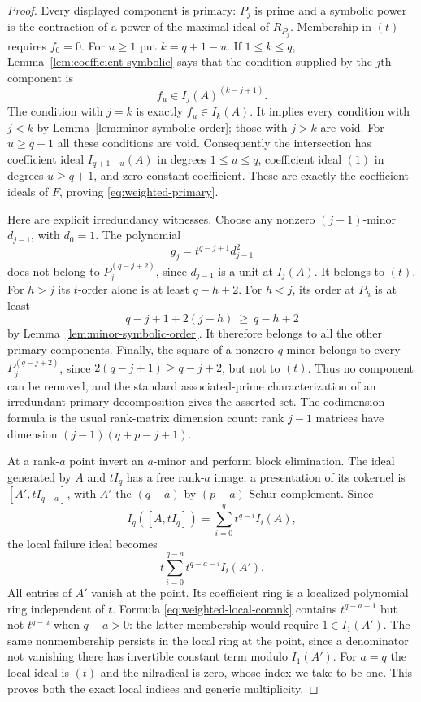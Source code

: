 \begin{proof}
Every displayed component is primary: $P_j$ is prime and a symbolic
power is the contraction of a power of the maximal ideal of $R_{P_j}$.
Membership in $(t)$ requires $f_0=0$. For $u\ge1$ put $k=q+1-u$.
If $1\le k\le q$, Lemma~\ref{lem:coefficient-symbolic} says that
the condition supplied by the $j$th component is
\[
 f_u\in I_j(A)^{(k-j+1)}.
\]
The condition with $j=k$ is exactly $f_u\in I_k(A)$.
It implies every condition with $j<k$ by
Lemma~\ref{lem:minor-symbolic-order}; those with $j>k$ are void.
For $u\ge q+1$ all these conditions are void. Consequently the
intersection has coefficient ideal $I_{q+1-u}(A)$ in degrees
$1\le u\le q$, coefficient ideal $(1)$ in degrees $u\ge q+1$,
and zero constant coefficient. These are exactly the coefficient
ideals of $F$, proving \eqref{eq:weighted-primary}.

Here are explicit irredundancy witnesses. Choose any nonzero
$(j-1)$-minor $d_{j-1}$, with $d_0=1$. The polynomial
\[
 g_j=t^{q-j+1}d_{j-1}^2
\]
does not belong to $P_j^{(q-j+2)}$, since $d_{j-1}$ is a unit
at $I_j(A)$. It belongs to $(t)$. For $h>j$ its $t$-order alone
is at least $q-h+2$. For $h<j$, its order at $P_h$ is at least
\[
 q-j+1+2(j-h)\ \ge\ q-h+2
\]
by Lemma~\ref{lem:minor-symbolic-order}. It therefore belongs to
all the other primary components. Finally, the square of a nonzero
$q$-minor belongs to every $P_j^{(q-j+2)}$, since
$2(q-j+1)\ge q-j+2$, but not to $(t)$. Thus no component can be
removed, and the standard associated-prime characterization of an
irredundant primary decomposition gives the asserted set.
The codimension formula is the usual rank-matrix dimension count:
rank $j-1$ matrices have dimension $(j-1)(q+p-j+1)$.

At a rank-$a$ point invert an $a$-minor and perform block elimination.
The ideal generated by $A$ and $tI_q$ has a free rank-$a$ image;
a presentation of its cokernel is $[A',tI_{q-a}]$, with $A'$ the
$(q-a)$ by $(p-a)$ Schur complement. Since
\[
 I_q([A,tI_q])=\sum_{i=0}^q t^{q-i}I_i(A),
\]
the local failure ideal becomes
\begin{equation}\label{eq:weighted-local-corank}
 t\sum_{i=0}^{q-a}t^{q-a-i}I_i(A').
\end{equation}
All entries of $A'$ vanish at the point. Its coefficient ring is a
localized polynomial ring independent of $t$. Formula
\eqref{eq:weighted-local-corank} contains $t^{q-a+1}$ but not
$t^{q-a}$ when $q-a>0$: the latter membership would require
$1\in I_1(A')$. The same nonmembership persists in the local ring
at the point, since a denominator not vanishing there has invertible
constant term modulo $I_1(A')$. For $a=q$ the local ideal is $(t)$
and the nilradical is zero, whose index we take to be one.
This proves both the exact local indices and generic multiplicity.
\end{proof}

